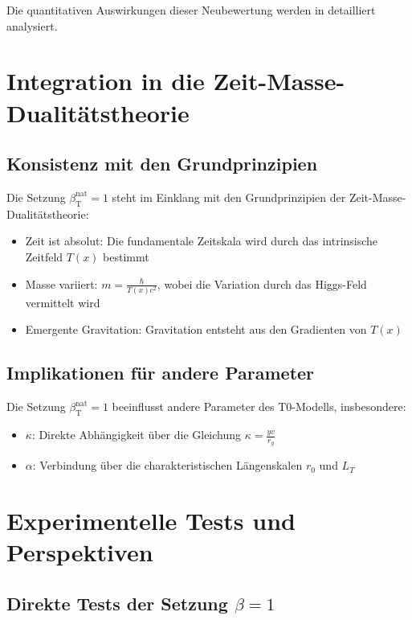 \documentclass[12pt,a4paper]{article}
\newcommand{\Tfield}{T(x)}
\newcommand{\betaT}{\beta_{\text{T}}}
\begin{document}
	Die quantitativen Auswirkungen dieser Neubewertung werden in \cite{pascher_alphabeta_2025} detailliert analysiert.
	
	\section{Integration in die Zeit-Masse-Dualitätstheorie}
	
	\subsection{Konsistenz mit den Grundprinzipien}
	
	Die Setzung \(\betaT^{\text{nat}} = 1\) steht im Einklang mit den Grundprinzipien der Zeit-Masse-Dualitätstheorie:
	\begin{itemize}
		\item Zeit ist absolut: Die fundamentale Zeitskala wird durch das intrinsische Zeitfeld \(\Tfield\) bestimmt
		\item Masse variiert: \(m = \frac{\hbar}{\Tfield c^2}\), wobei die Variation durch das Higgs-Feld vermittelt wird
		\item Emergente Gravitation: Gravitation entsteht aus den Gradienten von \(\Tfield\)
	\end{itemize}
	
	\subsection{Implikationen für andere Parameter}
	
	Die Setzung \(\betaT^{\text{nat}} = 1\) beeinflusst andere Parameter des T0-Modells, insbesondere:
	\begin{itemize}
		\item \(\kappa\): Direkte Abhängigkeit über die Gleichung \(\kappa = \frac{y v}{r_g}\)
		\item \(\alpha\): Verbindung über die charakteristischen Längenskalen \(r_0\) und \(L_T\)
	\end{itemize}
	
	\section{Experimentelle Tests und Perspektiven}
	
	\subsection{Direkte Tests der Setzung \(\beta = 1\)}
	
\end{document}
